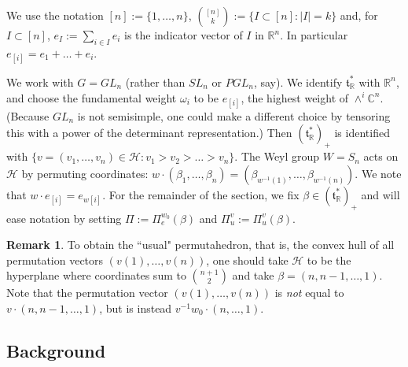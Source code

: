 \documentclass[11pt]{amsart}
\theoremstyle{definition}
\newtheorem{remark}[Thm]{Remark}
\newcommand{\RR}{\mathbb{R}}
\newcommand{\CC}{\mathbb{C}}
\def\pt{\beta}
\def\BB{{(\lie{t}_\RR^*)_+}}
\def\calH{{\mathcal H}}
\newcommand\lie[1]{{\mathfrak #1}}
\newcommand\junk[1]{}
\begin{document}
We use the notation $[n]:=\{1, \dots, n\}$,
$\binom{[n]}{k}:=\{I \subset [n]: |I|=k\}$ and, for $I \subset [n]$,
$e_I:= \sum_{i \in I} e_i$ is the indicator vector of $I$ in $\RR^n$.
In particular $e_{[i]} = e_1 + \ldots + e_i$.

We work with $G=GL_n$ (rather than $SL_n$ or $PGL_n$, say).
We identify $\lie t_\RR^*$ with $\RR^n$, and choose the fundamental weight $\omega_i$
to be $e_{[i]}$, the highest weight of $\wedge^i \CC^n$. (Because $GL_n$ is not
semisimple, one could make a different choice by tensoring this with a power
of the determinant representation.)
Then $\BB$ is identified with
$\{v=(v_1, \dots, v_n) \in \calH: v_1 > v_2 > \dots > v_n \}$. The
Weyl group $W=S_n$ acts on $\calH$ by permuting coordinates:
$w \cdot (\pt_1, \dots, \pt_n) = (\pt_{w^{-1}(1)}, \dots,
\pt_{w^{-1}(n)})$. We note that $w \cdot e_{[i]} = e_{w[i]}$. For the
remainder of the section, we fix $\pt \in \BB$ and will ease notation
by setting $\Pi:= \Pi_e^{w_0}(\pt)$ and $\Pi_u^v := \Pi_u^v(\pt)$.

\junk{As is standard, we identify $\lie t_\RR^*$ with
  $\RR^n/\RR \cdot \mathbf{1}$. The fundamental weight $\omega_i$ is
  represented by $e_{[i]}$. It is useful to further identify
  $\lie t_\RR^*$ with a hyperplane $\calH$ in $\RR^n$ normal to
  $(1, \dots, 1)$, so $\BB$ is identified with
  $\{v=(v_1, \dots, v_n) \in \calH: v_1 > v_2 > \dots > v_n \}$. The
  Weyl group $W=S_n$ acts on $\calH$ by permuting coordinates:
  $w \cdot (\pt_1, \dots, \pt_n) = (\pt_{w^{-1}(1)}, \dots,
  \pt_{w^{-1}(n)})$. We note that $w \cdot e_{[i]} = e_{w[i]}$. For
  the remainder of the section, we fix $\pt \in \BB$ and will ease
  notation by setting $\Pi:= \Pi_e^{w_0}(\pt)$ and $\Pi_u^v := \Pi_u^v(\pt)$.  }

\begin{remark}
	To obtain the ``usual" permutahedron, that is, the convex hull of all permutation vectors $(v(1), \dots, v(n))$, one should take $\calH$ to be the hyperplane where coordinates sum to $\binom{n+1}{2}$ and take $\pt=(n, n-1, \dots, 1)$. Note that the permutation vector $(v(1), \dots, v(n))$ is \emph{not} equal to $v \cdot (n, n-1, \dots, 1)$, but is instead $ v^{-1} w_0 \cdot (n, \dots, 1)$.
\end{remark}



\subsection{Background}
\end{document}
